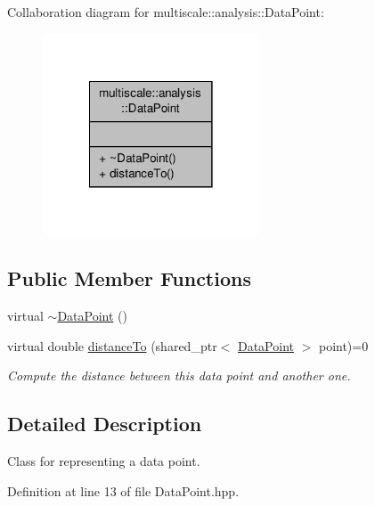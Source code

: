 Collaboration diagram for multiscale\-:\-:analysis\-:\-:Data\-Point\-:
\nopagebreak
\begin{figure}[H]
\begin{center}
\leavevmode
\includegraphics[width=182pt]{classmultiscale_1_1analysis_1_1DataPoint__coll__graph}
\end{center}
\end{figure}
\subsection*{Public Member Functions}
\begin{DoxyCompactItemize}
\item 
virtual \hyperlink{classmultiscale_1_1analysis_1_1DataPoint_ab7a7d2baf190376980cd3c2e130a9905}{$\sim$\-Data\-Point} ()
\item 
virtual double \hyperlink{classmultiscale_1_1analysis_1_1DataPoint_a8dd5def96eab756085461e8f6a201dce}{distance\-To} (shared\-\_\-ptr$<$ \hyperlink{classmultiscale_1_1analysis_1_1DataPoint}{Data\-Point} $>$ point)=0
\begin{DoxyCompactList}\small\item\em Compute the distance between this data point and another one. \end{DoxyCompactList}\end{DoxyCompactItemize}


\subsection{Detailed Description}
Class for representing a data point. 

Definition at line 13 of file Data\-Point.\-hpp.



